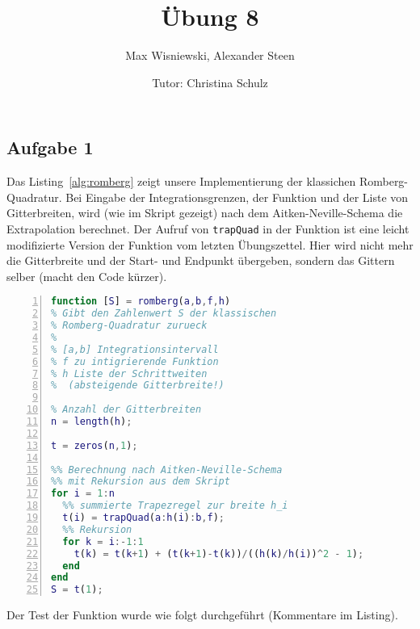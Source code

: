 \documentclass[11pt,a4paper,ngerman]{article}
\date{Tutor: Christina Schulz}
\title{Übung 8}
\author{Max Wisniewski, Alexander Steen}
\begin{document}

\renewcommand{\figurename}{Figure}

\maketitle
\thispagestyle{fancy}

\subsection*{Aufgabe 1}
Das Listing~\ref{alg:romberg} zeigt unsere Implementierung der klassichen Romberg-Quadratur.
Bei Eingabe der Integrationsgrenzen, der Funktion und der Liste von Gitterbreiten, wird (wie 
im Skript gezeigt) nach dem Aitken-Neville-Schema die Extrapolation berechnet.
Der Aufruf von \texttt{trapQuad} in der Funktion ist eine leicht modifizierte Version der Funktion vom letzten Übungszettel. Hier wird nicht mehr die Gitterbreite und der Start- und Endpunkt übergeben, sondern das Gittern selber (macht den Code kürzer).

\begin{lstlisting}[language=matlab, numbers=left, caption=Klassische Romberg-Quadratur, label=alg:romberg]
function [S] = romberg(a,b,f,h)
% Gibt den Zahlenwert S der klassischen
% Romberg-Quadratur zurueck
%
% [a,b] Integrationsintervall
% f zu intigrierende Funktion
% h Liste der Schrittweiten
%  (absteigende Gitterbreite!)

% Anzahl der Gitterbreiten
n = length(h);

t = zeros(n,1);

%% Berechnung nach Aitken-Neville-Schema
%% mit Rekursion aus dem Skript
for i = 1:n
  %% summierte Trapezregel zur breite h_i
  t(i) = trapQuad(a:h(i):b,f);
  %% Rekursion
  for k = i:-1:1
    t(k) = t(k+1) + (t(k+1)-t(k))/((h(k)/h(i))^2 - 1);
  end
end
S = t(1);
\end{lstlisting}

Der Test der Funktion wurde wie folgt durchgeführt (Kommentare im Listing).
\end{document}
